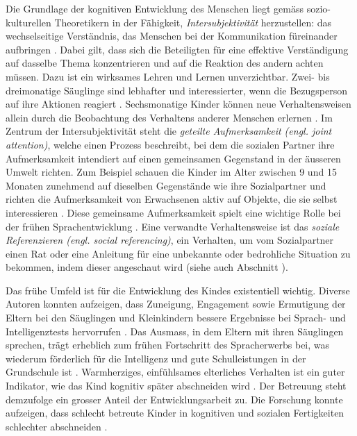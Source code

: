 Die Grundlage der kognitiven Entwicklung des Menschen liegt gemäss sozio-kulturellen Theoretikern in der Fähigkeit, \textit{Intersubjektivität} herzustellen: das wechselseitige Verständnis, das Menschen bei der Kommunikation füreinander aufbringen \cite{Gauvain2001, Rogoff1990}. Dabei gilt, dass sich die Beteiligten für eine effektive Verständigung auf dasselbe Thema konzentrieren und auf die Reaktion des andern achten müssen. Dazu ist ein wirksames Lehren und Lernen unverzichtbar. Zwei- bis dreimonatige Säuglinge sind lebhafter und interessierter, wenn die Bezugsperson auf ihre Aktionen reagiert \cite{Murray1985}. Sechsmonatige Kinder können neue Verhaltensweisen allein durch die Beobachtung des Verhaltens anderer Menschen erlernen \cite{Collie1999}. Im Zentrum der Intersubjektivität steht die \textit{geteilte Aufmerksamkeit (engl. joint attention)}, welche einen Prozess beschreibt, bei dem die sozialen Partner ihre Aufmerksamkeit intendiert auf einen gemeinsamen Gegenstand in der äusseren Umwelt richten. Zum Beispiel schauen die Kinder im Alter zwischen 9 und 15 Monaten zunehmend auf dieselben Gegenstände wie ihre Sozialpartner und richten die Aufmerksamkeit von Erwachsenen aktiv auf Objekte, die sie selbst interessieren  \nohyphens{\cite{Adamson1991, Gauvain2001}}. Diese gemeinsame Aufmerksamkeit spielt eine wichtige Rolle bei der frühen Sprachentwicklung \cite[S.~232]{Berk2011}. Eine verwandte Verhaltensweise ist das \textit{soziale Referenzieren (engl. social referencing)}, ein Verhalten, um vom Sozialpartner einen Rat oder eine Anleitung für eine unbekannte oder bedrohliche Situation zu bekommen, indem dieser angeschaut wird \cite{Campos1981} (siehe auch Abschnitt \textit{}). 

Das frühe Umfeld ist für die Entwicklung des Kindes existentiell wichtig. Diverse Autoren konnten aufzeigen, dass Zuneigung, Engagement sowie Ermutigung der Eltern bei den Säuglingen und Kleinkindern bessere Ergebnisse bei Sprach- und Intelligenztests hervorrufen \nohyphens{\cite{Fuligni2004, Linver2004, TamisLeMonda2004}}. Das Ausmass, in dem Eltern mit ihren Säuglingen sprechen, trägt erheblich zum frühen Fortschritt des Spracherwerbs bei, was wiederum förderlich für die Intelligenz und gute Schulleistungen in der Grundschule ist \cite{Hart1995}. Warmherziges, einfühlsames elterliches Verhalten ist ein guter Indikator, wie das Kind kognitiv später abschneiden wird \cite[S.~225]{Berk2011}. Der Betreuung steht demzufolge ein grosser Anteil der Entwicklungsarbeit zu. Die Forschung konnte aufzeigen, dass schlecht betreute Kinder in kognitiven und sozialen Fertigkeiten schlechter abschneiden \cite{NICHD2006}.

